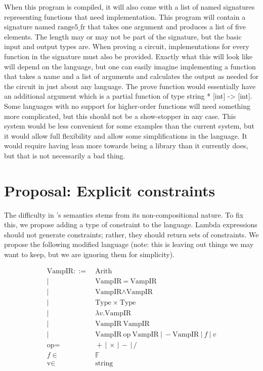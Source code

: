 \documentclass[
    9pt,            
    techreport,       
    affiltop,       
]{art}
\begin{document}
When this program is compiled, it will also come with a list of named signatures representing functions that need implementation. This program will contain a signature named $\text{range5\_fr}$ that takes one argument and produces a list of five elements. The length may or may not be part of the signature, but the basic input and output types are. When proving a circuit, implementations for every function in the signature must also be provided. Exactly what this will look like will depend on the language, but one can easily imagine implementing a function that takes a name and a list of arguments and calculates the output as needed for the circuit in just about any language. The prove function would essentially have an additional argument which is a partial function of type string * [int] -> [int]. Some languages with no support for higher-order functions will need something more complicated, but this should not be a show-stopper in any case. This system would be less convenient for some examples than the current system, but it would allow full flexibility and allow some simplifications in the language. It would require having \VampIR{} lean more towards being a library than it currently does, but that is not necessarily a bad thing.

\section{Proposal: Explicit constraints}
\label{sec:explicit-constraints}

The difficulty in \VampIR{}'s semantics stems from its non-compositional nature. To fix this, we propose adding a type of constraint to the language. Lambda expressions should not generate constraints; rather, they should return sets of constraints. We propose the following modified language (note: this is leaving out things we may want to keep, but we are ignoring them for simplicity).

\begin{align*}
    \text{VampIR} ::=&\ \text{Arith} \\
    |\ &\ \text{VampIR} \ = \ \text{VampIR} \\
    |\ &\ \text{VampIR} \wedge \text{VampIR} \\
    |\ &\ \text{Type} \ \times \ \text{Type} \\
    |\ &\ \lambda v . \text{VampIR} \\
    |\ &\ \text{VampIR}\ \text{VampIR} \\
    |\ &\ \text{VampIR} \ \text{op} \ \text{VampIR} \
    |\ - \text{VampIR}\ |\ f\ |\ v \\
    \text{op} =&\ + \,|\, \times \,|\, - \,|\, / \\
    f \in&\ \mathbb{F} \\
    \text{v} \in&\ \text{string}
\end{align*}
\end{document}
